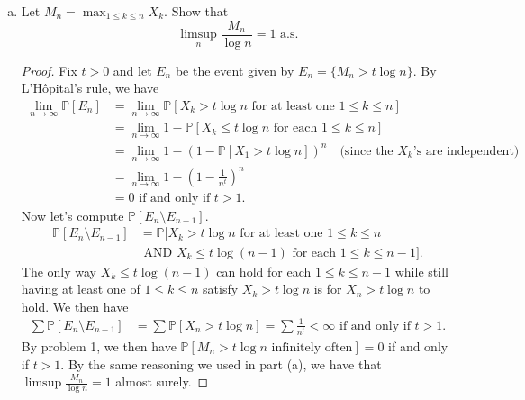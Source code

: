 \documentclass[11pt,letterpaper]{report}
\newcommand{\Prob}{\mathbb{P}}
\begin{document}
\begin{enumerate}[(a)]
	\item Let $M_n = \max_{1\leq k\leq n}X_k$. Show that
	\[
	\limsup_n \frac{M_n}{\log n} = 1\text{ a.s.}
	\]
	\begin{proof}
		Fix $t>0$ and let $E_n$ be the event given by $E_n= \{M_n > t\log n\}$. By L'H\^opital's rule, we have
		\begin{align*}
			\lim_{n\to \infty}\Prob[E_n] &= \lim_{n\to \infty}\Prob[X_k > t\log n\text{ for at least one }1\leq k\leq n]\\
			&= \lim_{n\to \infty}1 - \Prob[X_k \leq t\log n\text{ for each }1\leq k\leq n]\\
			&= \lim_{n\to \infty}1 - (1 - \Prob[X_1 >t\log n])^n\quad \text{(since the $X_k$'s are independent)}\\
			&= \lim_{n\to \infty}1 - \left(1 - \frac{1}{n^t}\right)^n\\
			&= 0 \text{ if and only if } t> 1.
		\end{align*}
		Now let's compute $\Prob[E_n \setminus E_{n-1}]$.
		\begin{align*}
			\Prob[E_n\setminus E_{n-1}] &= \Prob[X_k > t\log n\text{ for at least one }1\leq k \leq n\\
			&\text{ AND }X_k \leq t\log (n-1)\text{ for each }1\leq k\leq n-1].
		\end{align*}
		The only way $X_k \leq t\log (n-1)$ can hold for each $1\leq k\leq n-1$ while still having at least one of $1\leq k\leq n$ satisfy $X_k > t\log n$ is for $X_n >t\log n$ to hold. We then have
		\begin{align*}
			\sum \Prob[E_n \setminus E_{n-1}] &= \sum \Prob[X_n > t\log n]= \sum \frac{1}{n^t}<\infty \text{ if and only if }t > 1.
		\end{align*}
		By problem 1, we then have $\Prob[M_n > t\log n\text{ infinitely often}] = 0$ if and only if $t > 1$. By the same reasoning we used in part (a), we have that $\limsup \frac{M_n}{\log n} = 1$ almost surely.
	\end{proof}
\end{enumerate}
\end{document}
